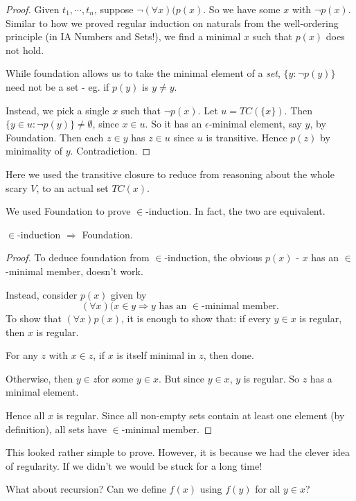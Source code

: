 \documentclass[a4paper]{article}
\begin{document}
\begin{proof}
  Given $t_1, \cdots, t_n$, suppose $\neg (\forall x)(p(x)$. So we have some $x$ with $\neg p(x)$. Similar to how we proved regular induction on naturals from the well-ordering principle (in IA Numbers and Sets!), we find a minimal $x$ such that $p(x)$ does not hold.

  While foundation allows us to take the minimal element of a \emph{set}, $\{y: \neg p(y)\}$ need not be a set - eg. if $p(y)$ is $y \not= y$.

  Instead, we pick a single $x$ such that $\neg p(x)$. Let $u = TC(\{x\})$. Then $\{y\in u: \neg p(y)\} \not= \emptyset$, since $x\in u$. So it has an $\epsilon$-minimal element, say $y$, by Foundation. Then each $z\in y$ has $z\in u$ since $u$ is transitive. Hence $p(z)$ by minimality of $y$. Contradiction.
\end{proof}
Here we used the transitive closure to reduce from reasoning about the whole scary $V$, to an actual set $TC(x)$.

\note We used Foundation to prove $\in$-induction. In fact, the two are equivalent.

\begin{prop}
  $\in$-induction $\Rightarrow $ Foundation.
\end{prop}

\begin{proof}
  To deduce foundation from $\in$-induction, the obvious $p(x)$ - $x$ has an $\in$-minimal member, doesn't work.
  
  Instead, consider $p(x)$ given by
  \[
    (\forall x)(x\in y \Rightarrow y\text{ has an }\in\text{-minimal member}.
  \]
  To show that $(\forall x)p(x)$, it is enough to show that: if every $y\in x$ is regular, then $x$ is regular.

  For any $z$ with $x\in z$, if $x$ is itself minimal in $z$, then done. 

  Otherwise, then $y\in z$for some $y\in x$. But since $y\in x$, $y$ is regular. So $z$ has a minimal element.

  Hence all $x$ is regular. Since all non-empty sets contain at least one element (by definition), all sets have $\in$-minimal member.
\end{proof}
\note This looked rather simple to prove. However, it is because we had the clever idea of regularity. If we didn't we would be stuck for a long time!

What about recursion? Can we define $f(x)$ using $f(y)$ for all $y\in x$?
\end{document}
